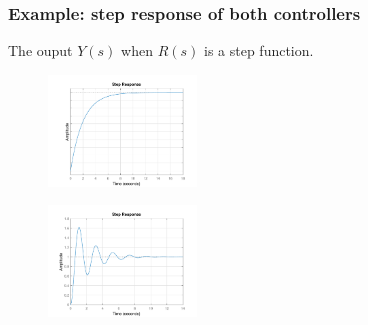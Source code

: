 \begin{frame}
	\frametitle{Example: step response of both controllers}
	The ouput $Y(s)$ when $R(s)$ is a step function.
	\vspace*{-1em}
	\begin{figure}
\centering
\includegraphics[width=\columnwidth,height=8em]{smooth-step}
\label{fig:smooth-step}
\end{figure}
\vspace*{-3em}
\begin{figure}
\centering
\includegraphics[width=\columnwidth,height=8em]{osc-step}
\label{fig:osc-step}
\end{figure}

\end{frame}

